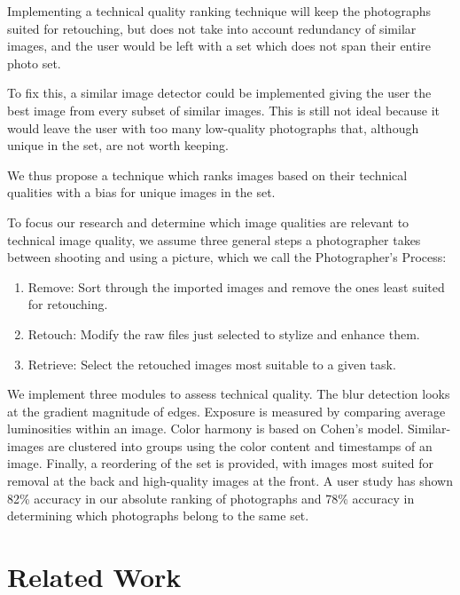 \documentclass{article}
\begin{document}

Implementing a technical quality ranking technique will keep the photographs suited for retouching, but does not take into account redundancy of similar images, and the user would be left with a set which does not span their entire photo set.

To fix this, a similar image detector could be implemented giving the user the best image from every subset of similar images. This is still not ideal because it would leave the user with too many low-quality photographs that, although unique in the set, are not worth keeping.

We thus propose a technique which ranks images based on their technical qualities with a bias for unique images in the set.

To focus our research and determine which image qualities are relevant to technical image quality, we assume three general steps a photographer takes between shooting and using a picture, which we call the Photographer's Process:
\begin{enumerate}
\item Remove: Sort through the imported images and remove the ones least suited for retouching.
\item Retouch: Modify the raw files just selected to stylize and enhance them.
\item Retrieve: Select the retouched images most suitable to a given task.
\end{enumerate}

We implement three modules to assess technical quality. The blur detection looks at the gradient magnitude of edges. Exposure is measured by comparing average luminosities within an image. Color harmony is based on Cohen's model\cite{Cohen-Or:2006:CH:1179352.1141933}. Similar-images are clustered into groups using the color content and timestamps of an image. Finally, a reordering of the set is provided, with images most suited for removal at the back and high-quality images at the front. A user study has shown 82\% accuracy in our absolute ranking of photographs and 78\% accuracy in determining which photographs belong to the same set.

\section{Related Work}
\end{document}
